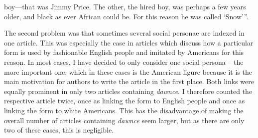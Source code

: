 boy—that was Jimmy Price. The other, the hired boy, was perhaps a few years older, and black as ever African could be. For this reason he was called ‘Snow’”.


The second problem was that sometimes several social personae are indexed in one article. This was especially the case in articles which discuss how a particular form is used by fashionable English people and imitated by Americans for this reason. In most cases, I have decided to only consider one social persona – the more important one, which in these cases is the American figure because it is the main motivation for authors to write the article in the first place. Both links were equally prominent in only two articles containing \emph{dawnce}. I therefore counted the respective article twice, once as linking the form to English people and once as linking the form to white Americans. This has the disadvantage of making the overall number of articles containing \emph{dawnce} seem larger, but as there are only two of these cases, this is negligible.

